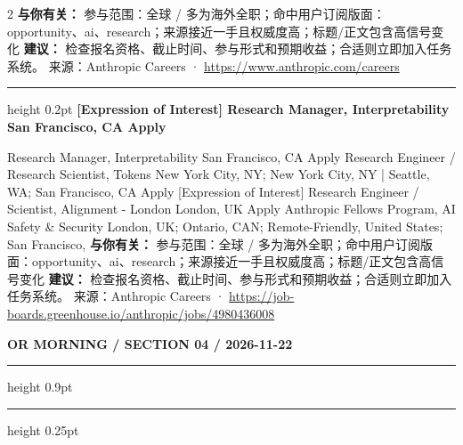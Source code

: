\documentclass[10.5pt]{ctexart}
\begin{document}
\begin{multicols}{2}
\textbf{与你有关：} 参与范围：全球 / 多为海外全职；命中用户订阅版面：opportunity、ai、research；来源接近一手且权威度高；标题/正文包含高信号变化
\textbf{建议：} 检查报名资格、截止时间、参与形式和预期收益；合适则立即加入任务系统。
{\footnotesize\color{ormuted} 来源：Anthropic Careers · \url{https://www.anthropic.com/careers}}
\vspace{2mm}
\hrule height 0.2pt
\vspace{2mm}
{\large\bfseries [Expression of Interest] Research Manager, Interpretability San Francisco, CA Apply}\par
[Expression of Interest] Research Manager, Interpretability San Francisco, CA Apply Research Engineer / Research Scientist, Tokens New York City, NY; New York City, NY | Seattle, WA; San Francisco, CA Apply [Expression of Interest] Research Engineer / Scientist, Alignment - London London, UK Apply Anthropic Fellows Program, AI Safety \& Security London, UK; Ontario, CAN; Remote-Friendly, United States; San Francisco, 
\textbf{与你有关：} 参与范围：全球 / 多为海外全职；命中用户订阅版面：opportunity、ai、research；来源接近一手且权威度高；标题/正文包含高信号变化
\textbf{建议：} 检查报名资格、截止时间、参与形式和预期收益；合适则立即加入任务系统。
{\footnotesize\color{ormuted} 来源：Anthropic Careers · \url{https://job-boards.greenhouse.io/anthropic/jobs/4980436008}}
\end{multicols}
\newpage
{\small\bfseries OR MORNING / SECTION 04 / 2026-11-22}
\vspace{2mm}
\hrule height 0.9pt
\vspace{1.5mm}
\hrule height 0.25pt
\vspace{4mm}
\end{document}
